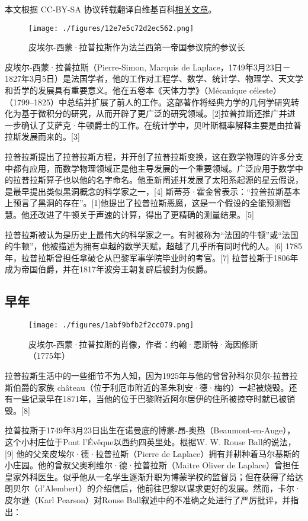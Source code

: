 
本文根据 CC-BY-SA 协议转载翻译自维基百科\href{https://en.wikipedia.org/wiki/Pierre-Simon_Laplace}{相关文章}。

\begin{figure}[ht]
\centering
\texttt{[image: ./figures/12e7e5c72d2ec562.png]}
\caption{皮埃尔-西蒙·拉普拉斯作为法兰西第一帝国参议院的参议长} \label{fig_LPLS_1}
\end{figure}
皮埃尔-西蒙·拉普拉斯（Pierre-Simon, Marquis de Laplace，1749年3月23日－1827年3月5日）是法国学者，他的工作对工程学、数学、统计学、物理学、天文学和哲学的发展具有重要意义。他在五卷本《天体力学》（Mécanique céleste）（1799–1825）中总结并扩展了前人的工作。这部著作将经典力学的几何学研究转化为基于微积分的研究，从而开辟了更广泛的研究领域。[2]拉普拉斯还推广并进一步确认了艾萨克·牛顿爵士的工作。在统计学中，贝叶斯概率解释主要是由拉普拉斯发展而来的。[3]

拉普拉斯提出了拉普拉斯方程，并开创了拉普拉斯变换，这在数学物理的许多分支中都有应用，而数学物理领域正是他主导发展的一个重要领域。广泛应用于数学中的拉普拉斯算子也以他的名字命名。他重新阐述并发展了太阳系起源的星云假说，是最早提出类似黑洞概念的科学家之一，[4] 斯蒂芬·霍金曾表示：“拉普拉斯基本上预言了黑洞的存在”。[1]他提出了拉普拉斯恶魔，这是一个假设的全能预测智慧。他还改进了牛顿关于声速的计算，得出了更精确的测量结果。[5]

拉普拉斯被认为是历史上最伟大的科学家之一。有时被称为“法国的牛顿”或“法国的牛顿”，他被描述为拥有卓越的数学天赋，超越了几乎所有同时代的人。[6] 1785年，拉普拉斯曾担任拿破仑从巴黎军事学院毕业时的考官。[7] 拉普拉斯于1806年成为帝国伯爵，并在1817年波旁王朝复辟后被封为侯爵。
\subsection{早年}
\begin{figure}[ht]
\centering
\texttt{[image: ./figures/1abf9bfb2f2cc079.png]}
\caption{皮埃尔-西蒙·拉普拉斯的肖像，作者：约翰·恩斯特·海因修斯（1775年）} \label{fig_LPLS_2}
\end{figure}
拉普拉斯生活中的一些细节不为人知，因为1925年与他的曾曾孙科尔贝尔-拉普拉斯伯爵的家族 château（位于利厄市附近的圣朱利安·德·梅约）一起被烧毁。还有一些记录早在1871年，当他的位于巴黎附近阿尔居伊的住所被掠夺时就已被销毁。[8]

拉普拉斯于1749年3月23日出生在诺曼底的博蒙-昂-奥热（Beaumont-en-Auge），这个小村庄位于Pont l'Évêque以西约四英里处。根据W. W. Rouse Ball的说法，[9] 他的父亲皮埃尔·德·拉普拉斯（Pierre de Laplace）拥有并耕种着马尔基斯的小庄园。他的曾叔父奥利维尔·德·拉普拉斯（Maitre Oliver de Laplace）曾担任皇家外科医生。似乎他从一名学生逐渐升职为博蒙学校的监督员；但在获得了给达朗贝尔（d'Alembert）的介绍信后，他前往巴黎以谋求更好的发展。然而，卡尔·皮尔逊（Karl Pearson）对Rouse Ball叙述中的不准确之处进行了严厉批评，并指出：

